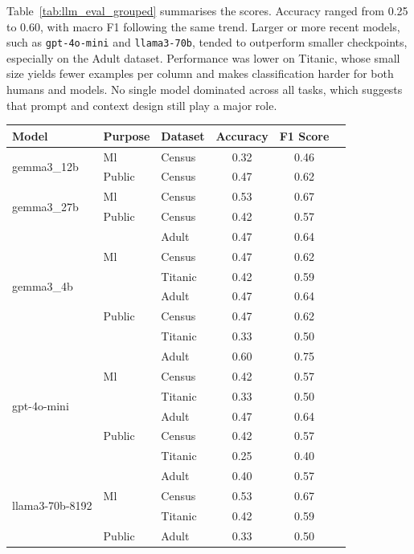 \documentclass{article}
\begin{document}
Table~\ref{tab:llm_eval_grouped} summarises the scores.  
Accuracy ranged from 0.25 to 0.60, with macro F1 following the same trend.  
Larger or more recent models, such as \texttt{gpt-4o-mini} and \texttt{llama3-70b}, tended to outperform smaller checkpoints, especially on the Adult dataset.  
Performance was lower on Titanic, whose small size yields fewer examples per column and makes classification harder for both humans and models.  
No single model dominated across all tasks, which suggests that prompt and context design still play a major role.

\begin{table}[h!]
\centering
\small
\begin{tabular}{lllccl}
\toprule
\textbf{Model} & \textbf{Purpose} & \textbf{Dataset} & \textbf{Accuracy} & \textbf{F1 Score} \\
\midrule
\multirow{2}{*}{gemma3\_12b} & Ml & Census & 0.32 & 0.46 \\
 & Public & Census & 0.47 & 0.62 \\
\midrule
\multirow{2}{*}{gemma3\_27b} & Ml & Census & 0.53 & 0.67 \\
 & Public & Census & 0.42 & 0.57 \\
\midrule
\multirow{6}{*}{gemma3\_4b} & \multirow{3}{*}{Ml} & Adult & 0.47 & 0.64 \\
 &  & Census & 0.47 & 0.62 \\
 &  & Titanic & 0.42 & 0.59 \\
 & \multirow{3}{*}{Public} & Adult & 0.47 & 0.64 \\
 &  & Census & 0.47 & 0.62 \\
 &  & Titanic & 0.33 & 0.50 \\
\midrule
\multirow{6}{*}{gpt-4o-mini} & \multirow{3}{*}{Ml} & Adult & 0.60 & 0.75 \\
 &  & Census & 0.42 & 0.57 \\
 &  & Titanic & 0.33 & 0.50 \\
 & \multirow{3}{*}{Public} & Adult & 0.47 & 0.64 \\
 &  & Census & 0.42 & 0.57 \\
 &  & Titanic & 0.25 & 0.40 \\
\midrule
\multirow{6}{*}{llama3-70b-8192} & \multirow{3}{*}{Ml} & Adult & 0.40 & 0.57 \\
 &  & Census & 0.53 & 0.67 \\
 &  & Titanic & 0.42 & 0.59 \\
 & \multirow{3}{*}{Public} & Adult & 0.33 & 0.50 \\

\end{tabular}
\end{table}
\end{document}

